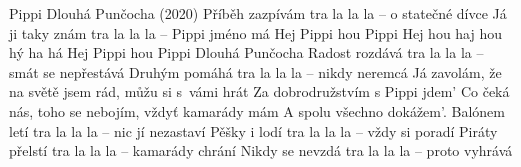 \begin{TEXT}{Pippi Dlouhá Punčocha (2020)}
\SLOKA Příběh zazpívám tra la la la -- o statečné dívce \NL
Já ji taky znám tra la la la -- Pippi jméno má \NL
\REFREN Hej Pippi hou Pippi \NL
Hej hou haj hou hý ha há \NL
Hej Pippi hou Pippi \NL
Dlouhá Punčocha \NL
\SLOKA Radost rozdává tra la la la -- smát se nepřestává \NL
Druhým pomáhá  tra la la la -- nikdy neremcá \NL
\REFRENB  Já zavolám, že na světě jsem rád, můžu si s vámi hrát \NL
Za dobrodružstvím s Pippi jdem' \NL
Co čeká nás, toho se nebojím, vždyť kamarády mám \NL
A spolu všechno dokážem'. \NL
\SLOKA Balónem letí tra la la la -- nic jí nezastaví \NL
Pěšky i lodí tra la la la -- vždy si poradí \NL
\SLOKA Piráty přelstí  tra la la la  -- kamarády chrání \NL
Nikdy se nevzdá  tra la la la -- proto vyhrává \NL
\REFRENHRAJ
\end{TEXT}